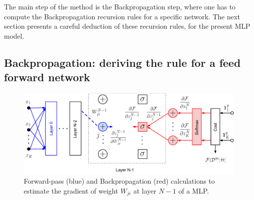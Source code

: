 The main step of the method is the Backpropagation step, where one has to compute the Backpropagation recursion rules for a specific network.
The next section presents a careful deduction of these recursion rules, for the present MLP model.

\subsection{Backpropagation: deriving the rule for a feed forward network}

\begin{figure}[!h]
\centering
\includegraphics[scale=0.6]{figs/deep_learning/NN_backprop_colored2.pdf}
\caption{Forward-pass (blue) and Backpropagation (red) calculations to estimate the gradient of weight $W_{ji}$ at layer $N-1$ of a MLP.}
\label{fig:NN_color}
\end{figure}

